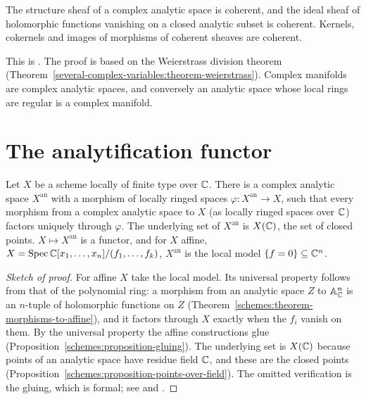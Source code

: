 \begin{theorem}\label{gaga:theorem-oka-cartan}
The structure sheaf of a complex analytic space is coherent, and the ideal sheaf of holomorphic functions vanishing on a closed analytic subset is coherent.
Kernels, cokernels and images of morphisms of coherent sheaves are coherent.
\end{theorem}

This is \cite[Chapters 2 and 4]{grauert-remmert}. The proof is based on the Weierstrass division theorem
(Theorem~\ref{several-complex-variables:theorem-weierstrass}). Complex manifolds are complex analytic spaces, and conversely an analytic space whose local
rings are regular is a complex manifold.

\section{The analytification functor}\label{gaga:section-analytification}

\begin{proposition}\label{gaga:proposition-analytification}
Let $X$ be a scheme locally of finite type over $\mathbb{C}$. There is a complex analytic space $X^{\mathrm{an}}$ with a morphism of locally ringed spaces
$\varphi \colon X^{\mathrm{an}} \to X$, such that every morphism from a complex analytic space to $X$ (as locally ringed spaces over $\mathbb{C}$) factors uniquely through
$\varphi$. The underlying set of $X^{\mathrm{an}}$ is $X(\mathbb{C})$, the set of closed points. $X \mapsto X^{\mathrm{an}}$ is a functor, and for $X$ affine,
$X = \operatorname{Spec}\mathbb{C}[x_1, \ldots, x_n]/(f_1, \ldots, f_k)$, $X^{\mathrm{an}}$ is the local model $\{f = 0\} \subseteq \mathbb{C}^n$.
\end{proposition}

\begin{proof}[Sketch of proof]
For affine $X$ take the local model. Its universal property follows from that of the polynomial ring: a morphism from an analytic space $Z$ to $\mathbb{A}^n_{\mathbb{C}}$ is an
$n$-tuple of holomorphic functions on $Z$ (Theorem~\ref{schemes:theorem-morphisms-to-affine}), and it factors through $X$ exactly when the $f_i$ vanish on them. By the
universal property the affine constructions glue (Proposition~\ref{schemes:proposition-gluing}). The underlying set is $X(\mathbb{C})$ because points of an analytic space
have residue field $\mathbb{C}$, and these are the closed points (Proposition~\ref{schemes:proposition-points-over-field}). The omitted verification is the gluing,
which is formal; see \cite[Appendix B]{hartshorne-ag} and \cite[Expos\'e XII]{sga1}.
\end{proof}

